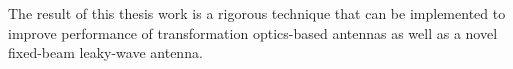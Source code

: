 The result of this thesis work is a rigorous technique that can be implemented to improve performance of transformation optics-based antennas as well as a novel fixed-beam leaky-wave antenna.






